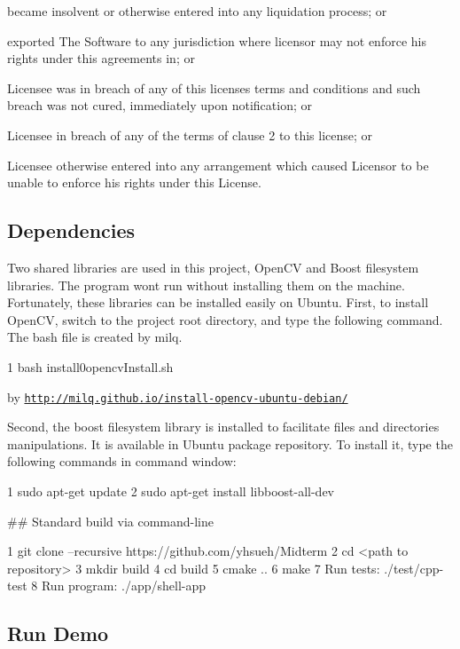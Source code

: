 \begin{DoxyItemize}
became insolvent or otherwise entered into any liquidation process; or

exported The Software to any jurisdiction where licensor may not enforce his rights under this agreements in; or

Licensee was in breach of any of this license\textquotesingle{}s terms and conditions and such breach was not cured, immediately upon notification; or

Licensee in breach of any of the terms of clause 2 to this license; or

Licensee otherwise entered into any arrangement which caused Licensor to be unable to enforce his rights under this License.
\end{DoxyItemize}

\subsection*{Dependencies}

Two shared libraries are used in this project, Open\+CV and Boost filesystem libraries. The program won\textquotesingle{}t run without installing them on the machine. Fortunately, these libraries can be installed easily on Ubuntu. First, to install Open\+CV, switch to the project root directory, and type the following command. The bash file is created by milq.


\begin{DoxyCode}
1 bash install0opencvInstall.sh
\end{DoxyCode}
 by \href{http://milq.github.io/install-opencv-ubuntu-debian/}{\tt http\+://milq.\+github.\+io/install-\/opencv-\/ubuntu-\/debian/}

Second, the boost filesystem library is installed to facilitate files and directories manipulations. It is available in Ubuntu package repository. To install it, type the following commands in command window\+:


\begin{DoxyCode}
1 sudo apt-get update
2 sudo apt-get install libboost-all-dev
\end{DoxyCode}


\#\# Standard build via command-\/line 
\begin{DoxyCode}
1 git clone --recursive https://github.com/yhsueh/Midterm
2 cd <path to repository>
3 mkdir build
4 cd build
5 cmake ..
6 make
7 Run tests: ./test/cpp-test
8 Run program: ./app/shell-app
\end{DoxyCode}


\subsection*{Run Demo}


